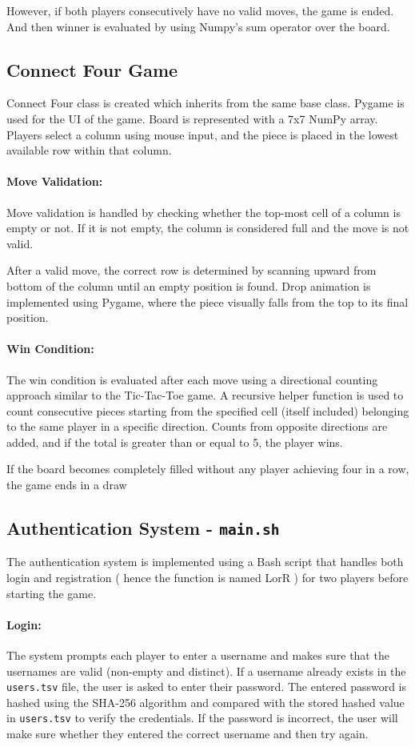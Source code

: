 \documentclass[12pt,a4paper]{article}
\begin{document}
However, if both players consecutively have no valid moves, the game is ended. And then winner is evaluated by using Numpy's sum operator over the board.

\subsection{Connect Four Game}
Connect Four class is created which inherits from the same base class. Pygame is used for the UI of the game. Board is represented with a 7x7 NumPy array. Players select a column using mouse input, and the piece is placed in the lowest available row within that column.
\paragraph{Move Validation:}
Move validation is handled by checking whether the top-most cell of a column is empty or not. If it is not empty, the column is considered full and the move is not valid.

After a valid move, the correct row is determined by scanning upward from bottom of the column until an empty position is found. Drop animation is implemented using Pygame, where the piece visually falls from the top to its final position.
\paragraph{Win Condition:}
The win condition is evaluated after each move using a directional counting approach similar to the Tic-Tac-Toe game. A recursive helper function is used to count consecutive pieces starting from the specified cell (itself included) belonging to the same player in a specific direction. Counts from opposite directions are added, and if the total is greater than or equal to 5, the player wins.

If the board becomes completely filled without any player achieving four in a row, the game ends in a draw

\subsection{Authentication System - \texttt{main.sh}}
The authentication system is implemented using a Bash script that handles both login and registration ( hence the function is named LorR ) for two players before starting the game.
\paragraph{Login:}
The system prompts each player to enter a username and makes sure that the usernames are valid (non-empty and distinct). If a username already exists in the \texttt{users.tsv} file, the user is asked to enter their password. The entered password is hashed using the SHA-256 algorithm and compared with the stored hashed value in \texttt{users.tsv} to verify the credentials. If the password is incorrect, the user will make sure whether they entered the correct username and then try again.
\end{document}
